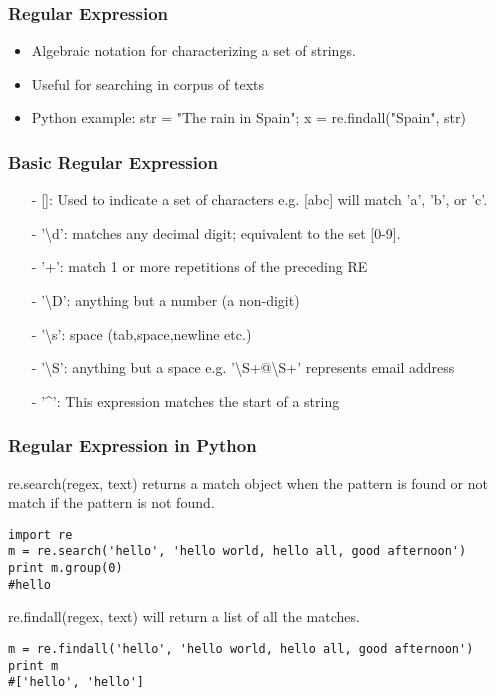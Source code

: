 \documentclass[notheorems, aspectratio=54]{beamer}
\begin{document}
\begin{frame}
   \frametitle{Regular Expression}
\begin{itemize}
\item Algebraic notation for characterizing a set of strings.
\item Useful for searching in corpus of texts
\item Python example: str = "The rain in Spain"; x = re.findall("Spain", str)
\end{itemize}
\end{frame}

\begin{frame}
   \frametitle{Basic Regular Expression}
\begin{itemize}
\item[-][]: Used to indicate a set of characters e.g. [abc] will match 'a', 'b', or 'c'.
\item[-]'\textbackslash d': matches any decimal digit; equivalent to the set [0-9].
\item[-] '+': match 1 or more repetitions of the preceding RE
\item[-]'\textbackslash D': anything but a number (a non-digit)	
\item[-] '\textbackslash s': space (tab,space,newline etc.)
\item[-] '\textbackslash S': anything but a space e.g. '\textbackslash S+@\textbackslash S+' represents email address
\item[-]'\textasciicircum': This expression matches the start of a string
\end{itemize}

\end{frame}
\begin{frame}[fragile]
\frametitle{Regular Expression in Python}
re.search(regex, text) returns a match object when the pattern is found or not match if the pattern is not found.
\begin{lstlisting}
import re
m = re.search('hello', 'hello world, hello all, good afternoon')
print m.group(0)
#hello
\end{lstlisting}

re.findall(regex, text) will return a list of all the matches.
\begin{lstlisting}
m = re.findall('hello', 'hello world, hello all, good afternoon')
print m
#['hello', 'hello']
\end{lstlisting}
\end{frame}
\end{document}
